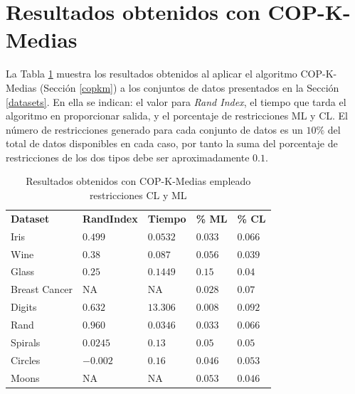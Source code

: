 \section{Resultados obtenidos con COP-K-Medias}

La Tabla \ref{tab:tabla5} muestra los resultados obtenidos al aplicar el algoritmo COP-K-Medias (Sección \ref{copkm}) a los conjuntos de datos presentados en la Sección \ref{datasets}. En ella se indican: el valor para \textit{Rand Index}, el tiempo que tarda el algoritmo en proporcionar salida, y el porcentaje de restricciones \acs{ML} y \acs{CL}. El número de restricciones generado para cada conjunto de datos es un $10\%$ del total de datos disponibles en cada caso, por tanto la suma del porcentaje de restricciones de los dos tipos debe ser aproximadamente $0.1$.

\begin{table}[!h]
	\centering
	\setlength{\arrayrulewidth}{1mm}
	\setlength{\tabcolsep}{10pt}
	\renewcommand{\arraystretch}{0.75}
	
	\begin{tabular}{ >{\centering\arraybackslash}m{2.5cm}  >{\centering\arraybackslash}m{1.8cm}>{\centering\arraybackslash}m{1.5cm}>{\centering\arraybackslash}m{1.2cm}>{\centering\arraybackslash}m{1.2cm}}
		\hline
		\rowcolor{black}
		\multicolumn{5}{c}{\bf \color{white}{Resultados de COP-K-Medias con restricciones CL y ML}}\\
		\hline
		\rowcolor{gray!50}
		\textbf{Dataset} & \textbf{RandIndex} & \textbf{Tiempo} & \textbf{\% ML} & \textbf{\% CL}  \\
		Iris & $0.499$ & $0.0532$ & $0.033$ & $0.066$ \\
		Wine & $0.38$ & $0.087$ & $0.056$ & $0.039$ \\
		Glass  & $0.25$ & $0.1449$ & $0.15$ & $0.04$ \\
		Breast Cancer & NA & NA & $0.028$ & $0.07$ \\ 
		Digits & $0.632$ & $13.306$ & $0.008$ & $0.092$ \\
		Rand & $0.960$ & $0.0346$ & $0.033$ & $0.066$ \\
		Spirals & $0.0245$ & $0.13$ & $0.05$ & $0.05$ \\
		Circles & $-0.002$ & $0.16$ & $0.046$ & $0.053$ \\
		Moons & NA & NA & $0.053$ & $0.046$ \\
		\hline
		
	\end{tabular}
	\caption{Resultados obtenidos con COP-K-Medias empleado restricciones \acs{CL} y \acs{ML}}
	\label{tab:tabla5}
\end{table}

